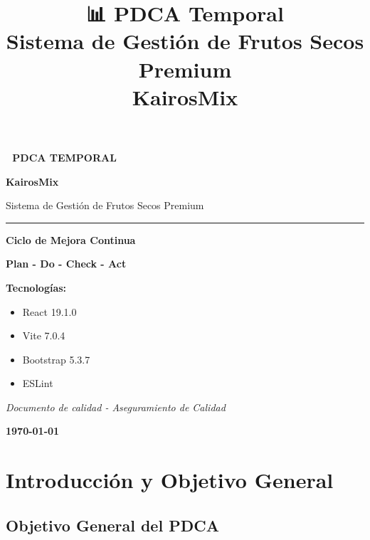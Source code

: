 \documentclass[12pt,a4paper]{report}
\title{
    \textcolor{cafeOscuro}{\Large \textbf{📊 PDCA Temporal}} \\
    \textcolor{verde}{\Large \textbf{Sistema de Gestión de Frutos Secos Premium}} \\
    \vspace{0.5cm}
    \textcolor{cafeOscuro}{\large KairosMix}
}
\author{}
\date{}
\begin{document}
\begin{titlepage}
    \centering
    \vspace*{3cm}
    
    \textcolor{cafeOscuro}{\Huge \textbf{🌰 PDCA TEMPORAL}}
    
    \vspace{1cm}
    \textcolor{verde}{\huge \textbf{KairosMix}}
    
    \vspace{1cm}
    \textcolor{cafeOscuro}{\Large Sistema de Gestión de Frutos Secos Premium}
    
    \vspace{3cm}
    \rule{\textwidth}{2pt}
    
    \vspace{2cm}
    \textbf{\Large Ciclo de Mejora Continua}
    
    \vspace{1cm}
    \textbf{Plan - Do - Check - Act}
    
    \vspace{3cm}
    
    \begin{flushleft}
        \textbf{Tecnologías:}
        \begin{itemize}
            \item React 19.1.0
            \item Vite 7.0.4
            \item Bootstrap 5.3.7
            \item ESLint
        \end{itemize}
    \end{flushleft}
    
    \vfill
    \textcolor{grisClaro}{\textit{Documento de calidad - Aseguramiento de Calidad}}
    
    \vspace{1cm}
    \textcolor{cafeOscuro}{\textbf{\today}}
    
\end{titlepage}

\tableofcontents
\newpage

\chapter{Introducción y Objetivo General}

\section{Objetivo General del PDCA}
\end{document}
